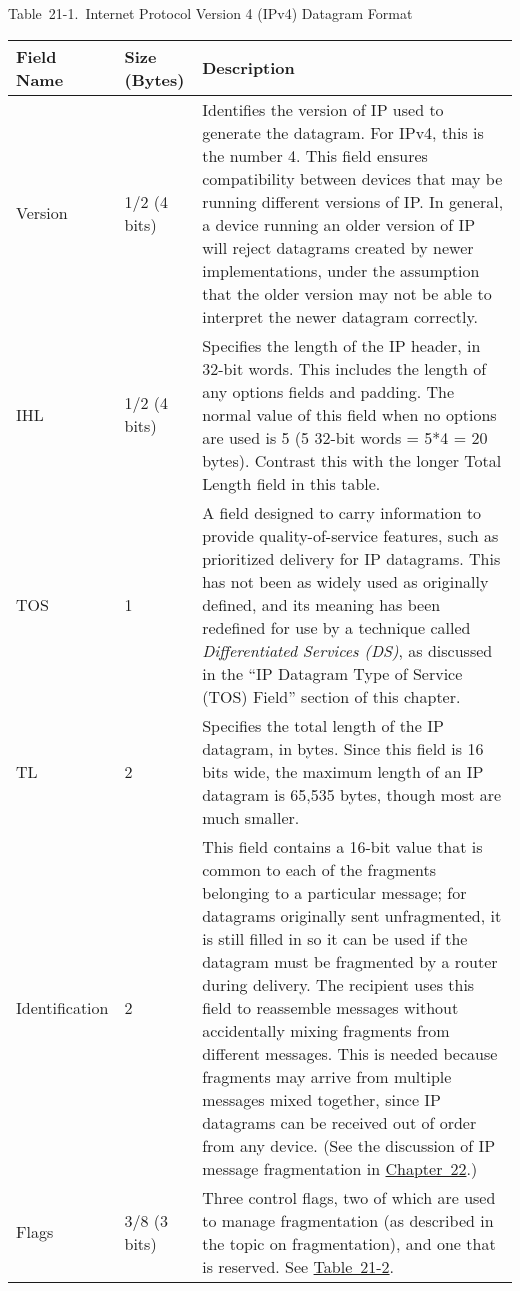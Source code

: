 \protect\hypertarget{ch21s02.htmlux5cux23internet_protocol_version__ipv_datagram}{}{}

Table~21-1.~Internet Protocol Version 4 (IPv4) Datagram Format

\begin{longtable}[]{@{}lll@{}}
\toprule
Field Name & Size (Bytes) & Description\tabularnewline
\midrule
\endhead
Version & 1/2 (4 bits) & Identifies the version of IP used to generate
the datagram. For IPv4, this is the number 4. This field ensures
compatibility between devices that may be running different versions of
IP. In general, a device running an older version of IP will reject
datagrams created by newer implementations, under the assumption that
the older version may not be able to interpret the newer datagram
correctly.\tabularnewline
IHL & 1/2 (4 bits) & Specifies the length of the IP header, in 32-bit
words. This includes the length of any options fields and padding. The
normal value of this field when no options are used is 5 (5 32-bit words
= 5*4 = 20 bytes). Contrast this with the longer Total Length field in
this table.\tabularnewline
TOS & 1 & A field designed to carry information to provide
quality-of-service features, such as prioritized delivery for IP
datagrams. This has not been as widely used as originally defined, and
its meaning has been redefined for use by a technique called
{\emph{Differentiated Services (DS)}}, as discussed in the ``IP Datagram
Type of Service (TOS) Field'' section of this chapter.\tabularnewline
TL & 2 & Specifies the total length of the IP datagram, in bytes. Since
this field is 16 bits wide, the maximum length of an IP datagram is
65,535 bytes, though most are much smaller.\tabularnewline
Identification & 2 & This field contains a 16-bit value that is common
to each of the fragments belonging to a particular message; for
datagrams originally sent unfragmented, it is still filled in so it can
be used if the datagram must be fragmented by a router during delivery.
The recipient uses this field to reassemble messages without
accidentally mixing fragments from different messages. This is needed
because fragments may arrive from multiple messages mixed together,
since IP datagrams can be received out of order from any device. (See
the discussion of IP message fragmentation in
\protect\hyperlink{ch22.html}{Chapter~22}.)\tabularnewline
Flags & 3/8 (3 bits) & Three control flags, two of which are used to
manage fragmentation (as described in the topic on fragmentation), and
one that is reserved. See
\protect\hyperlink{ch21s02.htmlux5cux23ipv_flags_subfields}{Table~21-2}.\tabularnewline

\end{longtable}
